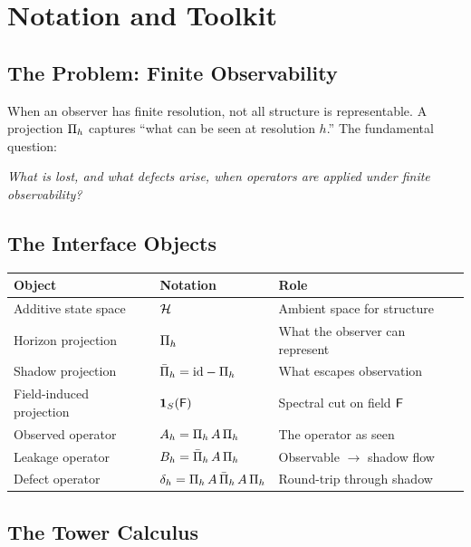 \section{Notation and Toolkit}
\label{sec:orientation}

\subsection{The Problem: Finite Observability}

When an observer has finite resolution, not all structure is representable.
A projection $\CCPi{h}$ captures ``what can be seen at resolution $h$.''
The fundamental question:
\begin{center}
\emph{What is lost, and what defects arise, when operators are applied under finite observability?}
\end{center}

\subsection{The Interface Objects}

\begin{center}
\renewcommand{\arraystretch}{1.3}
\begin{tabular}{@{}lll@{}}
\textbf{Object} & \textbf{Notation} & \textbf{Role} \\
\hline
Additive state space & $\cH$ & Ambient space for structure \\
Horizon projection & $\CCPi{h}$ & What the observer can represent \\
Shadow projection & $\CCPibar{h} = \id - \CCPi{h}$ & What escapes observation \\
Field-induced projection & $\CCSpProj{\CCField}{S}$ & Spectral cut on field $\CCField$ \\
Observed operator & $\CCObs{A}{h} = \CCRestr{A}{h}$ & The operator as seen \\
Leakage operator & $\CCLeak{A}{h} = \CCLeakExpr{A}{h}$ & Observable $\to$ shadow flow \\
Defect operator & $\CCDefect{A}{h} = \CCDefectExpr{A}{h}$ & Round-trip through shadow \\
\end{tabular}
\end{center}

\subsection{The Tower Calculus}


